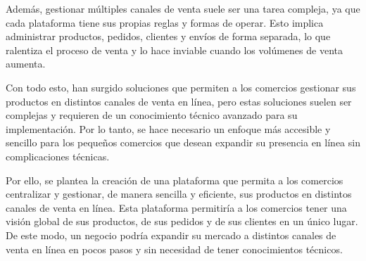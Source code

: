 Además, gestionar múltiples canales de venta suele ser una tarea compleja, ya que cada plataforma tiene sus propias reglas y formas de operar. Esto implica administrar productos, pedidos, clientes y envíos de forma separada, lo que ralentiza el proceso de venta y lo hace inviable cuando los volúmenes de venta aumenta.

Con todo esto, han surgido soluciones que permiten a los comercios gestionar sus productos en distintos canales de venta en línea, pero estas soluciones suelen ser complejas y requieren de un conocimiento técnico avanzado para su implementación. Por lo tanto, se hace necesario un enfoque más accesible y sencillo para los pequeños comercios que desean expandir su presencia en línea sin complicaciones técnicas.

Por ello, se plantea la creación de una plataforma que permita a los comercios centralizar y gestionar, de manera sencilla y eficiente, sus productos en distintos canales de venta en línea. Esta plataforma permitiría a los comercios tener una visión global de sus productos, de sus pedidos y de sus clientes en un único lugar. De este modo, un negocio podría expandir su mercado a distintos canales de venta en línea en pocos pasos y sin necesidad de tener conocimientos técnicos.
